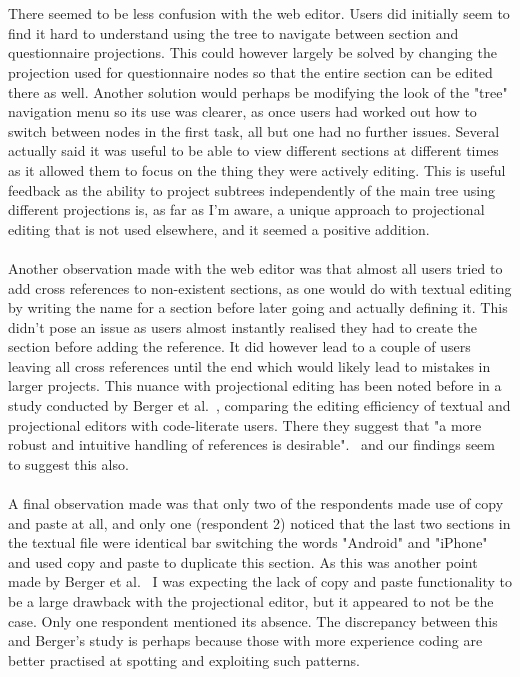 \documentclass{article}
\begin{document}
{\\
\\
There seemed to be less confusion with the web editor. Users did initially seem to find it hard to understand using the tree to navigate between section and questionnaire projections. This could however largely be solved by changing the projection used for questionnaire nodes so that the entire section can be edited there as well. Another solution would perhaps be modifying the look of the "tree" navigation menu so its use was clearer, as once users had worked out how to switch between nodes in the first task, all but one had no further issues. Several actually said it was useful to be able to view different sections at different times as it allowed them to focus on the thing they were actively editing. This is useful feedback as the ability to project subtrees independently of the main tree using different projections is, as far as I'm aware, a unique approach to projectional editing that is not used elsewhere, and it seemed a positive addition.
\\
\\
Another observation made with the web editor was that almost all users tried to add cross references to non-existent sections, as one would do with textual editing by writing the name for a section before later going and actually defining it. This didn't pose an issue as users almost instantly realised they had to create the section before adding the reference. It did however lead to a couple of users leaving all cross references until the end which would likely lead to mistakes in larger projects. This nuance with projectional editing has been noted before in a study conducted by Berger et al.~\cite{projEditControlledExperiment}, comparing the editing efficiency of textual and projectional editors with code-literate users. There they suggest that "a more robust and intuitive handling of references is desirable".~\cite[pg. 9]{projEditControlledExperiment} and our findings seem to suggest this also.
\\
\\
A final observation made was that only two of the respondents made use of copy and paste at all, and only one (respondent 2) noticed that the last two sections in the textual file were identical bar switching the words "Android" and "iPhone" and used copy and paste to duplicate this section. As this was another point made by Berger et al.~\cite{projEditControlledExperiment} I was expecting the lack of copy and paste functionality to be a large drawback with the projectional editor, but it appeared to not be the case. Only one respondent mentioned its absence. The discrepancy between this and Berger's study is perhaps because those with more experience coding are better practised at spotting and exploiting such patterns.

}
\end{document}

